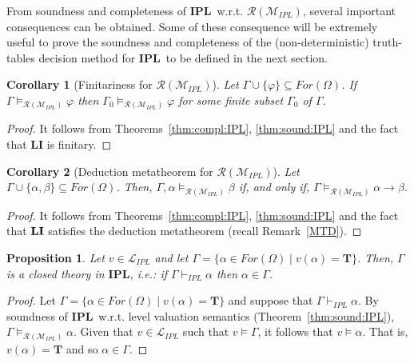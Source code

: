 \documentclass[12pt]{article}
\newtheorem{corollary}{Corollary}[theorem]
\newtheorem{proposition}[theorem]{Proposition}
\newcommand{\bT}{\mathbf{T}}
\newcommand{\ipl}{\ensuremath{\mathbf{IPL}}}
\begin{document}
From soundness and completeness of \ipl\ w.r.t.  $\mathcal{R}(\mathcal{M}_{IPL})$, several important consequences can be obtained. Some of these consequence will be extremely useful to prove the soundness and completeness of the (non-deterministic) truth-tables decision method for \ipl\ to be defined in the next section.

\begin{corollary} [Finitariness for $\mathcal{R}(\mathcal{M}_{IPL})$] \label{compact_RN_IPL}  Let $\Gamma \cup\{\varphi\} \subseteq For(\Omega)$. If $\Gamma \models_{\mathcal{R}(\mathcal{M}_{IPL})} \varphi$  then $\Gamma_0 \models_{\mathcal{R}(\mathcal{M}_{IPL})} \varphi$ for some finite subset $\Gamma_0$ of $\Gamma$. 
\end{corollary}
\begin{proof} It follows from  Theorems~\ref{thm:compl:IPL},  \ref{thm:sound:IPL}  and the fact that  {\bf LI} is finitary.
\end{proof}


\begin{corollary} [Deduction metatheorem for $\mathcal{R}(\mathcal{M}_{IPL})$] \label{MTD_RN_IPL}  Let $\Gamma \cup\{\alpha,\beta\} \subseteq For(\Omega)$. Then, $\Gamma, \alpha \models_{\mathcal{R}(\mathcal{M}_{IPL})} \beta$  if, and only if, $\Gamma \models_{\mathcal{R}(\mathcal{M}_{IPL})} \alpha \to \beta$. 
\end{corollary}
\begin{proof} It follows from  Theorems~\ref{thm:compl:IPL},  \ref{thm:sound:IPL}  and the fact that  ${\bf LI}$ satisfies the deduction metatheorem (recall Remark~\ref{MTD}).
\end{proof}

\begin{proposition} \label{closed-T} Let $v \in \mathcal{L}_{IPL}$ and let $\Gamma=\{\alpha \in For(\Omega)  \mid v(\alpha)=\bT\}$. Then, $\Gamma$ is a closed theory in \ipl, i.e.: if $\Gamma \vdash_{IPL} \alpha$ then $\alpha \in \Gamma$.
\end{proposition}
\begin{proof}
Let $\Gamma=\{\alpha \in For(\Omega)  \mid v(\alpha)=\bT\}$ and suppose that $\Gamma \vdash_{IPL} \alpha$. By soundness of \ipl\ w.r.t. level valuation semantics  (Theorem~\ref{thm:sound:IPL}), $\Gamma  \models_{\mathcal{R}(\mathcal{M}_{IPL})} \alpha$. Given that $v \in \mathcal{L}_{IPL}$ such that $v\models\Gamma$, it follows that $v \models\alpha$. That is, $v(\alpha)=\bT$ and so $\alpha \in \Gamma$. 
\end{proof}
\end{document}
